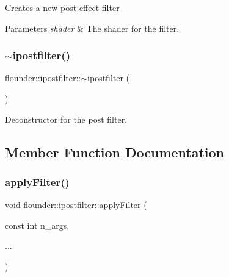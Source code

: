 Creates a new post effect filter 


\begin{DoxyParams}{Parameters}
{\em shader} & The shader for the filter. \\
\hline
\end{DoxyParams}
\mbox{\label{classflounder_1_1ipostfilter_aca15b2f21a5f07ddcff5dcad764e137c}} 
\subsubsection{\texorpdfstring{$\sim$ipostfilter()}{~ipostfilter()}}
{\footnotesize\ttfamily flounder\+::ipostfilter\+::$\sim$ipostfilter (\begin{DoxyParamCaption}{ }\end{DoxyParamCaption})\hspace{0.3cm}{\ttfamily [virtual]}}



Deconstructor for the post filter. 



\subsection{Member Function Documentation}
\mbox{\label{classflounder_1_1ipostfilter_a34cced83864d9d6b1c664a0337cd97b2}} 
\subsubsection{\texorpdfstring{apply\+Filter()}{applyFilter()}\hspace{0.1cm}{\footnotesize\ttfamily [1/2]}}
{\footnotesize\ttfamily void flounder\+::ipostfilter\+::apply\+Filter (\begin{DoxyParamCaption}\item[{const int}]{n\+\_\+args,  }\item[{}]{... }\end{DoxyParamCaption})}



